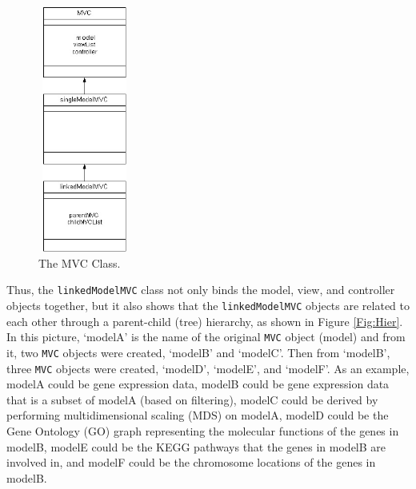 \documentclass{article}[11pt]
\newcommand{\Robject}[1]{{\texttt{#1}}}
\newcommand{\Rclass}[1]{\texttt{#1}}
\begin{document}
\begin{figure}[ht]
  \begin{center}
    \includegraphics[height=3.2in, width=1.2in]{fullMVCClass.jpg}
    \caption{ The MVC Class. }
    \label{Fig:MVCClass}
  \end{center}
\end{figure}

Thus, the \Rclass{linkedModelMVC} class not only binds the model,
view, and controller objects together, but it also shows
that the \Robject{linkedModelMVC} objects are related to each other through a
parent-child (tree) hierarchy, as shown in Figure \ref{Fig:Hier}.  In this
picture, `modelA' is the name of the original \Robject{MVC} object
(model) and from it, two \Robject{MVC} objects were created,
`modelB' and `modelC'. Then from `modelB', three
\Robject{MVC} objects were created, `modelD', `modelE', and
`modelF'.  As an example, modelA could be gene 
expression data, modelB could be gene expression data that is a subset of
modelA (based on filtering), modelC could be derived by performing
multidimensional scaling (MDS) on modelA, modelD could be the Gene Ontology
(GO) graph representing the molecular functions of the genes in modelB,
modelE could be the KEGG pathways that the genes in modelB are involved
in, and modelF could be the chromosome locations of the genes in modelB.

\end{document}

